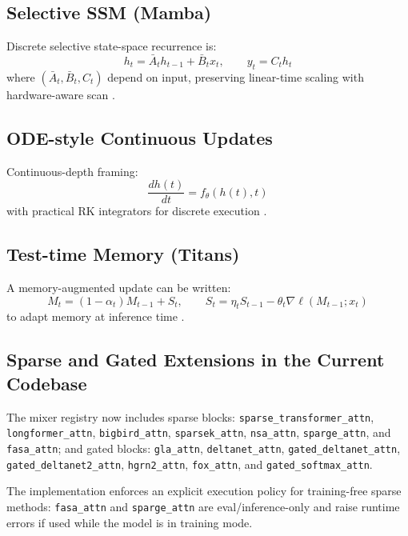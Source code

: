 \documentclass[11pt,a4paper]{article}
\begin{document}
\subsection{Selective SSM (Mamba)}
Discrete selective state-space recurrence is:
\[
h_t=\bar{A}_t h_{t-1}+\bar{B}_t x_t,\qquad y_t=C_t h_t
\]
where $(\bar{A}_t,\bar{B}_t,C_t)$ depend on input, preserving linear-time scaling with hardware-aware scan \citep{gu_mamba_2023,hwang_hydra_2024}.

\subsection{ODE-style Continuous Updates}
Continuous-depth framing:
\[
\frac{dh(t)}{dt}=f_\theta(h(t),t)
\]
with practical RK integrators for discrete execution \citep{zhang_continuous_2021}.

\subsection{Test-time Memory (Titans)}
A memory-augmented update can be written:
\[
M_t=(1-\alpha_t)M_{t-1}+S_t,\qquad
S_t=\eta_t S_{t-1}-\theta_t\nabla \ell(M_{t-1};x_t)
\]
to adapt memory at inference time \citep{behrouz_titans_2025,behrouz_titans_2024}.

\subsection{Sparse and Gated Extensions in the Current Codebase}
The mixer registry now includes sparse blocks:
\texttt{sparse\_transformer\_attn}, \texttt{longformer\_attn}, \texttt{bigbird\_attn},
\texttt{sparsek\_attn}, \texttt{nsa\_attn}, \texttt{sparge\_attn}, and \texttt{fasa\_attn};
and gated blocks:
\texttt{gla\_attn}, \texttt{deltanet\_attn}, \texttt{gated\_deltanet\_attn},
\texttt{gated\_deltanet2\_attn}, \texttt{hgrn2\_attn}, \texttt{fox\_attn}, and \texttt{gated\_softmax\_attn}.

The implementation enforces an explicit execution policy for training-free sparse methods:
\texttt{fasa\_attn} and \texttt{sparge\_attn} are eval/inference-only and raise runtime errors if used while the model is in training mode.
\end{document}

